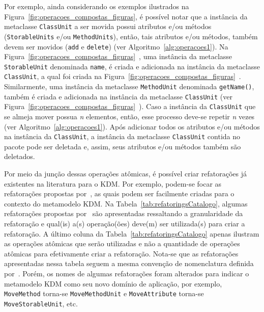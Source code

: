 Por exemplo, ainda considerando os exemplos ilustrados na Figura~\ref{fig:operacoes_compostas_figuras}, é possível notar que a instância da metaclasse \texttt{ClassUnit} a ser movida possui atributos e/ou métodos (\texttt{StorableUnits} e/ou \texttt{MethodUnits}), então, tais atributos e/ou métodos, também devem ser movidos (\texttt{add} e \texttt{delete}) (ver Algoritmo~\ref{alg:operacoes1}). Na Figura~\ref{fig:operacoes_compostas_figuras}~, uma instância da metaclasse \texttt{StorableUnit} denominada \texttt{name}, é criada e adicionada na instância da metaclasse \texttt{ClassUnit}, a qual foi criada na Figura~\ref{fig:operacoes_compostas_figuras}~. Similarmente, uma instância da metaclasse \texttt{MethodUnit} denominada \texttt{getName()}, também é criada e adicionada na instância da metaclasse \texttt{ClassUnit} (ver Figura~\ref{fig:operacoes_compostas_figuras}~). Caso a instância da \texttt{ClassUnit} que se almeja mover possua \textit{n} elementos, então, esse processo deve-se repetir \textit{n} vezes (ver Algoritmo~\ref{alg:operacoes1}). Após adicionar todos os atributos e/ou métodos na instância da \texttt{ClassUnit}, a instância da metaclasse \texttt{ClassUnit} contida no pacote  pode ser deletada e, assim, seus atributos e/ou métodos também são deletados.



Por meio da junção dessas operações atômicas, é possível criar refatorações já existentes na literatura para o KDM. Por exemplo, podem-se focar as refatorações propostas por~, as quais podem ser facilmente criadas para o contexto do metamodelo KDM. Na Tabela~\ref{tab:refatoringsCatalogo}, algumas refatorações propostas por~ são apresentadas ressaltando a granularidade da refatoração e qual(is) a(s) operação(ões) deve(m) ser utilizada(s) para criar a refatoração. A último coluna da Tabela~\ref{tab:refatoringsCatalogo} apenas ilustram as operações atômicas que serão utilizadas e não a quantidade de operações atômicas para efetivamente criar a refatoração. Nota-se que as refatorações apresentadas nessa tabela seguem a mesma convenção de nomenclatura definida por~. Porém, os nomes de algumas refatorações foram alterados para indicar o metamodelo KDM como seu novo domínio de aplicação, por exemplo, \texttt{MoveMethod} torna-se \texttt{MoveMethodUnit} e \texttt{MoveAttribute} torna-se \texttt{MoveStorableUnit}, etc.


